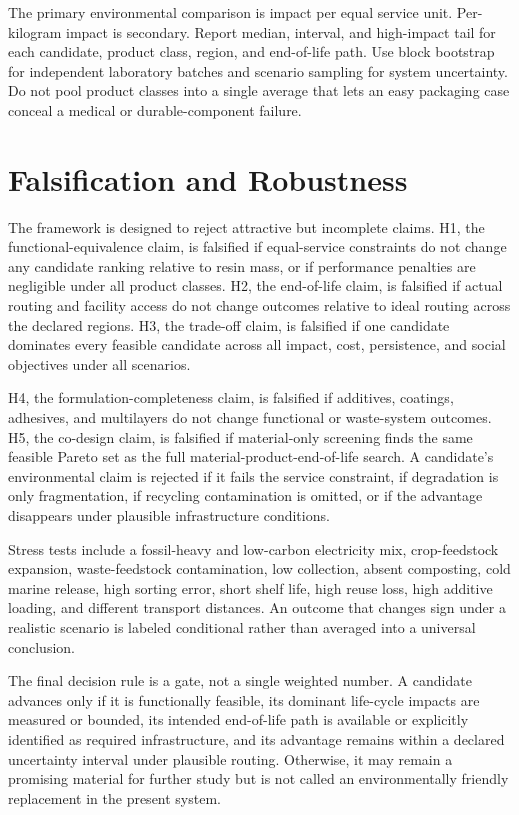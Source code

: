 \documentclass[conference]{IEEEtran}
\begin{document}
The primary environmental comparison is impact per equal service unit. Per-kilogram impact is secondary. Report median, interval, and high-impact tail for each candidate, product class, region, and end-of-life path. Use block bootstrap for independent laboratory batches and scenario sampling for system uncertainty. Do not pool product classes into a single average that lets an easy packaging case conceal a medical or durable-component failure.

\section{Falsification and Robustness}

The framework is designed to reject attractive but incomplete claims. H1, the functional-equivalence claim, is falsified if equal-service constraints do not change any candidate ranking relative to resin mass, or if performance penalties are negligible under all product classes. H2, the end-of-life claim, is falsified if actual routing and facility access do not change outcomes relative to ideal routing across the declared regions. H3, the trade-off claim, is falsified if one candidate dominates every feasible candidate across all impact, cost, persistence, and social objectives under all scenarios.

H4, the formulation-completeness claim, is falsified if additives, coatings, adhesives, and multilayers do not change functional or waste-system outcomes. H5, the co-design claim, is falsified if material-only screening finds the same feasible Pareto set as the full material-product-end-of-life search. A candidate's environmental claim is rejected if it fails the service constraint, if degradation is only fragmentation, if recycling contamination is omitted, or if the advantage disappears under plausible infrastructure conditions.

Stress tests include a fossil-heavy and low-carbon electricity mix, crop-feedstock expansion, waste-feedstock contamination, low collection, absent composting, cold marine release, high sorting error, short shelf life, high reuse loss, high additive loading, and different transport distances. An outcome that changes sign under a realistic scenario is labeled conditional rather than averaged into a universal conclusion.

The final decision rule is a gate, not a single weighted number. A candidate advances only if it is functionally feasible, its dominant life-cycle impacts are measured or bounded, its intended end-of-life path is available or explicitly identified as required infrastructure, and its advantage remains within a declared uncertainty interval under plausible routing. Otherwise, it may remain a promising material for further study but is not called an environmentally friendly replacement in the present system.
\end{document}
